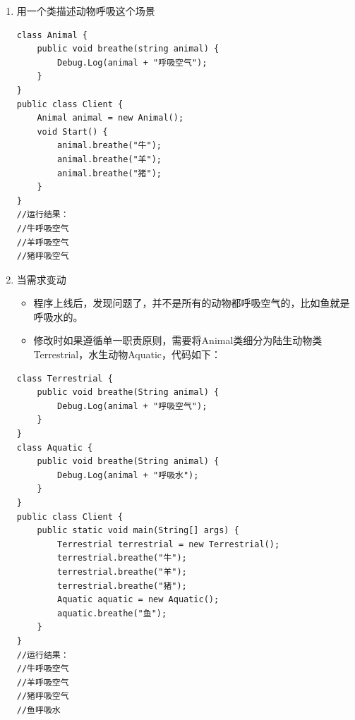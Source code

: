\documentclass[9pt, b5paper]{article}
\begin{document}
\begin{enumerate}
\item 用一个类描述动物呼吸这个场景
\label{sec:org813e3f3}
\begin{verbatim}
class Animal {
    public void breathe(string animal) {
        Debug.Log(animal + "呼吸空气");
    }
}
public class Client {
    Animal animal = new Animal();
    void Start() {
        animal.breathe("牛");
        animal.breathe("羊");
        animal.breathe("猪");
    }
}
//运行结果：
//牛呼吸空气
//羊呼吸空气
//猪呼吸空气
\end{verbatim}

\item 当需求变动
\label{sec:orge6ba1cb}
\begin{itemize}
\item 程序上线后，发现问题了，并不是所有的动物都呼吸空气的，比如鱼就是呼吸水的。
\item 修改时如果遵循单一职责原则，需要将Animal类细分为陆生动物类Terrestrial，水生动物Aquatic，代码如下：
\end{itemize}
\begin{verbatim}
class Terrestrial {
    public void breathe(String animal) {
        Debug.Log(animal + "呼吸空气");
    }
}
class Aquatic {
    public void breathe(String animal) {
        Debug.Log(animal + "呼吸水");
    }
}
public class Client {
    public static void main(String[] args) {
        Terrestrial terrestrial = new Terrestrial();
        terrestrial.breathe("牛");
        terrestrial.breathe("羊");
        terrestrial.breathe("猪");
        Aquatic aquatic = new Aquatic();
        aquatic.breathe("鱼");
    }
}
//运行结果：
//牛呼吸空气
//羊呼吸空气
//猪呼吸空气
//鱼呼吸水
\end{verbatim}


\end{enumerate}
\end{document}
